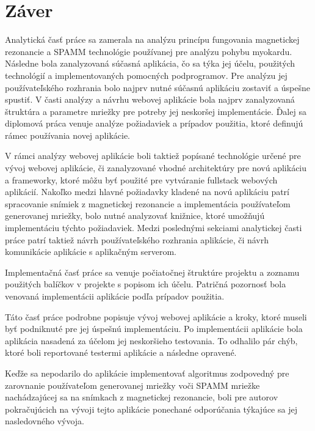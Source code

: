 \chapter {Záver}
Analytická časť práce sa zamerala na analýzu princípu fungovania magnetickej rezonancie a SPAMM technológie používanej pre analýzu pohybu myokardu. Následne bola zanalyzovaná súčasná aplikácia, čo sa týka jej účelu, použitých technológií a implementovaných pomocných podprogramov. Pre analýzu jej používateľského rozhrania bolo najprv nutné súčasnú aplikáciu zostaviť a úspešne spustiť. V časti analýzy a návrhu webovej aplikácie bola najprv zanalyzovaná štruktúra a parametre mriežky pre potreby jej neskoršej implementácie. Ďalej sa diplomová práca venuje analýze požiadaviek a prípadov použitia, ktoré definujú rámec používania novej aplikácie.

V rámci analýzy webovej aplikácie boli taktiež popísané technológie určené pre vývoj webovej aplikácie, či zanalyzované vhodné architektúry pre novú aplikáciu a frameworky, ktoré môžu byť použité pre vytváranie fullstack webových aplikácií. Nakoľko medzi hlavné požiadavky kladené na novú aplikáciu patrí spracovanie snímiek z magnetickej rezonancie a implementácia používateľom generovanej mriežky, bolo nutné analyzovať knižnice, ktoré umožňujú implementáciu týchto požiadaviek. Medzi poslednými sekciami analytickej časti práce patrí taktiež návrh používateľského rozhrania aplikácie, či návrh komunikácie aplikácie s aplikačným serverom.

Implementačná časť práce sa venuje počiatočnej štruktúre projektu a zoznamu použitých balíčkov v projekte s popisom ich účelu. Patričná pozornosť bola venovaná implementácii aplikácie podľa prípadov použitia.

Táto časť práce podrobne popisuje vývoj webovej aplikácie a kroky, ktoré museli byť podniknuté pre jej úspešnú implementáciu. Po implementácii aplikácie bola aplikácia nasadená za účelom jej neskoršieho testovania. To odhalilo pár chýb, ktoré boli reportované testermi aplikácie a následne opravené.

Keďže sa nepodarilo do aplikácie implementovať algoritmus zodpovedný pre zarovnanie používateľom generovanej mriežky voči SPAMM mriežke nachádzajúcej sa na snímkach z magnetickej rezonancie, boli pre autorov pokračujúcich na vývoji tejto aplikácie ponechané odporúčania týkajúce sa jej nasledovného vývoja.